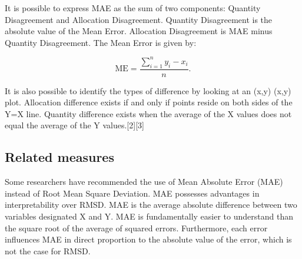 \documentclass[]{report}
\begin{document}
It is possible to express MAE as the sum of two components: Quantity Disagreement and Allocation Disagreement. Quantity Disagreement is the absolute value of the Mean Error. Allocation Disagreement is MAE minus Quantity Disagreement. The Mean Error is given by:

\[{\displaystyle \mathrm {ME} ={\frac {\sum _{i=1}^{n}y_{i}-x_{i}}{n}}.} \]

It is also possible to identify the types of difference by looking at an {\displaystyle (x,y)} (x,y) plot. Allocation difference exists if and only if points reside on both sides of the Y=X line. Quantity difference exists when the average of the X values does not equal the average of the Y values.[2][3]
\subsection*{Related measures}
Some researchers have recommended the use of Mean Absolute Error (MAE) instead of Root Mean Square Deviation. MAE possesses advantages in interpretability over RMSD. MAE is the average absolute difference between two variables designated X and Y. MAE is fundamentally easier to understand than the square root of the average of squared errors. Furthermore, each error influences MAE in direct proportion to the absolute value of the error, which is not the case for RMSD.
\end{document}
